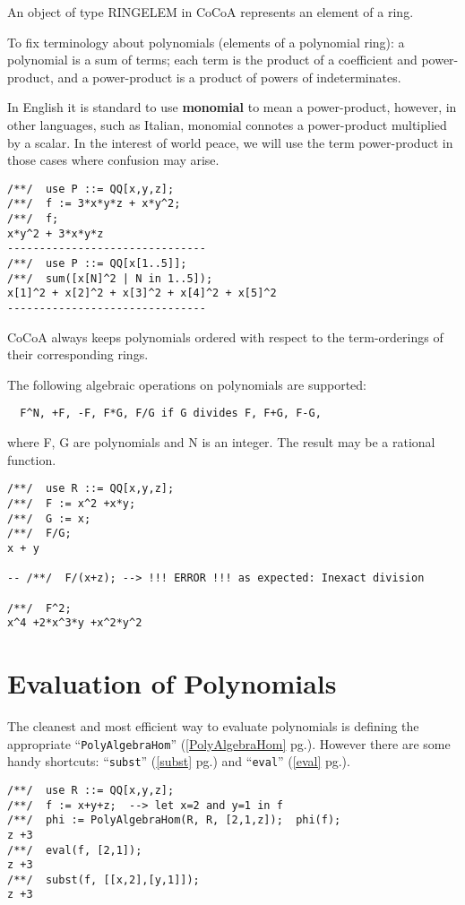 \documentclass[a4paper]{mybook}
\begin{document}
        
An object of type RINGELEM in CoCoA represents an element of a ring.
\par 
To fix terminology about polynomials (elements of a polynomial ring):
a polynomial is a sum of terms; each term is the product of a
coefficient and power-product, and a power-product is a product of
powers of indeterminates.
\par 
In English it is standard to use \textbf{monomial} to mean a power-product,
however, in other languages, such as Italian, monomial connotes a
power-product multiplied by a scalar.  In the interest of world peace, we
will use the term power-product in those cases where confusion may arise.
\begin{Verbatim}[label=example, rulecolor=\color{PineGreen}, frame=single]
/**/  use P ::= QQ[x,y,z];
/**/  f := 3*x*y*z + x*y^2;
/**/  f;
x*y^2 + 3*x*y*z
-------------------------------
/**/  use P ::= QQ[x[1..5]];
/**/  sum([x[N]^2 | N in 1..5]);
x[1]^2 + x[2]^2 + x[3]^2 + x[4]^2 + x[5]^2
-------------------------------
\end{Verbatim}

CoCoA always keeps polynomials ordered with respect to the
term-orderings of their corresponding rings.
\par 
The following algebraic operations on polynomials are supported:
\begin{verbatim}
  F^N, +F, -F, F*G, F/G if G divides F, F+G, F-G,
\end{verbatim}
where F, G are polynomials and N is an integer.  The result may be a
rational function.
\begin{Verbatim}[label=example, rulecolor=\color{PineGreen}, frame=single]
/**/  use R ::= QQ[x,y,z];
/**/  F := x^2 +x*y;
/**/  G := x;
/**/  F/G;
x + y

-- /**/  F/(x+z); --> !!! ERROR !!! as expected: Inexact division

/**/  F^2;
x^4 +2*x^3*y +x^2*y^2
\end{Verbatim}



\section{Evaluation of Polynomials}
\label{Evaluation of Polynomials}

        
The cleanest and most efficient way to evaluate polynomials is
defining the appropriate ``\verb&PolyAlgebraHom&'' (\ref{PolyAlgebraHom} pg.\pageref{PolyAlgebraHom}).
However there are some handy shortcuts: ``\verb&subst&'' (\ref{subst} pg.\pageref{subst}) and ``\verb&eval&'' (\ref{eval} pg.\pageref{eval}).
\begin{Verbatim}[label=example, rulecolor=\color{PineGreen}, frame=single]
/**/  use R ::= QQ[x,y,z];
/**/  f := x+y+z;  --> let x=2 and y=1 in f
/**/  phi := PolyAlgebraHom(R, R, [2,1,z]);  phi(f);
z +3
/**/  eval(f, [2,1]);
z +3
/**/  subst(f, [[x,2],[y,1]]);
z +3
\end{Verbatim}
\end{document}
